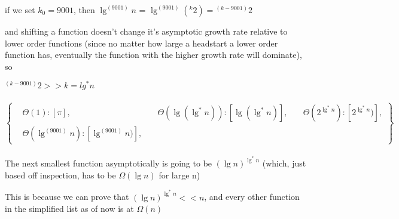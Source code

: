 \documentclass[11pt,fleqn]{article}
\theoremstyle{definition}
\theoremstyle{remark}
\begin{document}
if we set $k_0 = 9001$, then $\lg^{(9001)} n$ = $\lg^{(9001)} ({}^k 2) = {}^{(k-9001)} 2$

and shifting a function doesn't change it's asymptotic growth rate relative
to lower order functions (since no matter how large a headstart a lower order
function has, eventually the function with the higher growth rate will dominate), so

${}^{(k - 9001)} 2 >> k =lg^*n$\\\\

\[
\left\{
\begin{aligned}
& \Theta(1): [\pi],
& \quad \Theta(\lg(\lg^*n)): [\lg(\lg^*n)],
& \quad \Theta(2^{\lg^*n}): [2^{\lg^*n})],\\
& \Theta(\lg^{(9001)} n): [\lg^{(9001)} n)],
\end{aligned}
\right\}
\]\\


The next smallest function asymptotically is going to be
${(\lg n)}^{\lg^*{n}}$ (which, just based off inspection, has to be $\Omega(\lg n)$ for large n)

This is because we can prove that ${(\lg n)}^{\lg^*{n}} << n$, and
every other function in the simplified list as of now is at $\Omega(n)$
\end{document}
